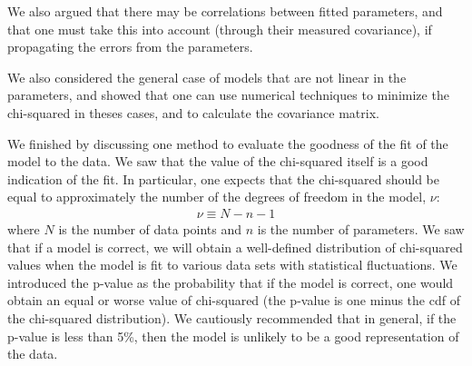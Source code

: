 \begin{chapterSummary}
We also argued that there may be correlations between fitted parameters, and that one must take this into account (through their measured covariance), if propagating the errors from the parameters.

We also considered the general case of models that are not linear in the parameters, and showed that one can use numerical techniques to minimize the chi-squared in theses cases, and to calculate the covariance matrix.

We finished by discussing one method to evaluate the goodness of the fit of the model to the data. We saw that the value of the chi-squared itself is a good indication of the fit. In particular, one expects that the chi-squared should be equal to approximately the number of the degrees of freedom in the model, $\nu$:
\begin{align}
\nu\equiv N-n-1
\end{align}
where $N$ is the number of data points and $n$ is the number of parameters. We saw that if a model is correct, we will obtain a well-defined distribution of chi-squared values when the model is fit to various data sets with statistical fluctuations. We introduced the p-value as the probability that if the model is correct, one would obtain an equal or worse value of chi-squared (the p-value is one minus the cdf of the chi-squared distribution). We cautiously recommended that in general, if the p-value is less than 5\%, then the model is unlikely to be a good representation of the data.
\end{chapterSummary}